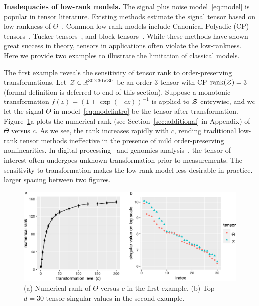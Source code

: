\documentclass{article}
\theoremstyle{plain}
\theoremstyle{definition}
\begin{document}
{\bf Inadequacies of  low-rank models.} The signal plus noise model~\eqref{eq:model} is popular in tensor literature. Existing methods estimate the signal tensor based on low-rankness of $\Theta$~\citep{jain2014provable,montanari2018spectral}. Common low-rank models include Canonical Polyadic (CP) tensors~\citep{hitchcock1927expression}, Tucker tensors~\citep{de2000multilinear}, and block tensors~\citep{wang2019multiway}. While these methods have shown great success in theory, tensors in applications often violate the low-rankness. Here we provide two examples to illustrate the limitation of classical models.


The first example reveals the sensitivity of tensor rank to order-preserving transformations. Let $\mathcal{Z} \in \mathbb{R}^{30\times 30\times 30}$ be an order-3 tensor with CP $\text{rank}(\mathcal{Z})=3$ (formal definition is deferred to end of this section). Suppose a monotonic transformation $f(z)=(1+\exp(-cz))^{-1}$ is applied to $\mathcal{Z}$ entrywise, and we let the signal $\Theta$ in model~\eqref{eq:modelintro} be the tensor after transformation. Figure~\ref{fig:example}a plots the numerical rank (see Section~\ref{sec:additional} in Appendix) of $\Theta$ versus $c$. As we see, the rank increases rapidly with $c$, rending traditional low-rank tensor methods ineffective in the presence of mild order-preserving nonlinearities. In  digital processing~\citep{ghadermarzy2018learning} and genomics analysis~\citep{hore2016tensor}, the tensor of interest often undergoes unknown transformation prior to measurements. The sensitivity to transformation makes the low-rank model less desirable in practice. {\color{red} larger spacing between two figures.}


\begin{figure}[h]
\captionsetup{font=scriptsize}
\centering
\vspace{-.3cm}
\includegraphics[width=.6\textwidth]{figure/example_comb.pdf}
\vspace{-.2cm}
\caption{\scriptsize (a) Numerical rank of $\Theta$ versus $c$ in the first example. (b) Top $d=30$ tensor singular values in the second example. }
\vspace{-.3cm}
\label{fig:example}
\end{figure}
\end{document}
